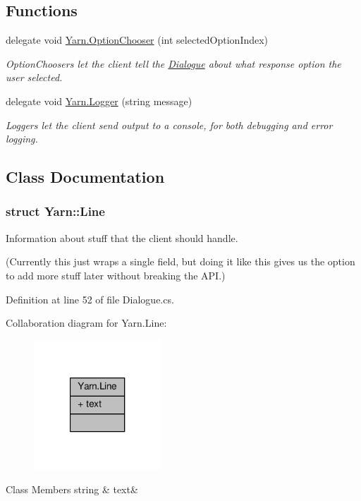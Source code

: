 \subsection*{Functions}
\begin{DoxyCompactItemize}
\item 
delegate void \hyperlink{a00045_a39866cbb03c03a35805d598b5d4ad553}{Yarn.\-Option\-Chooser} (int selected\-Option\-Index)
\begin{DoxyCompactList}\small\item\em Option\-Choosers let the client tell the \hyperlink{a00086}{Dialogue} about what response option the user selected. \end{DoxyCompactList}\item 
delegate void \hyperlink{a00045_a1e50031b945a3a2afafee6f590730568}{Yarn.\-Logger} (string message)
\begin{DoxyCompactList}\small\item\em Loggers let the client send output to a console, for both debugging and error logging. \end{DoxyCompactList}\end{DoxyCompactItemize}


\subsection{Class Documentation}
\label{a00365}
\hypertarget{a00045_a00365}{}
\subsubsection{struct Yarn\-:\-:Line}
Information about stuff that the client should handle. 

(Currently this just wraps a single field, but doing it like this gives us the option to add more stuff later without breaking the A\-P\-I.) 

Definition at line 52 of file Dialogue.\-cs.



Collaboration diagram for Yarn.\-Line\-:
\nopagebreak
\begin{figure}[H]
\begin{center}
\leavevmode
\includegraphics[width=136pt]{a00378}
\end{center}
\end{figure}
\begin{DoxyFields}{Class Members}
\hypertarget{a00045_a81d1f04bbb4cf6642d2bd685bda1da20}{string}\label{a00045_a81d1f04bbb4cf6642d2bd685bda1da20}
&
text&
\\
\hline

\end{DoxyFields}
\label{a00368}
\hypertarget{a00045_a00368}{}
